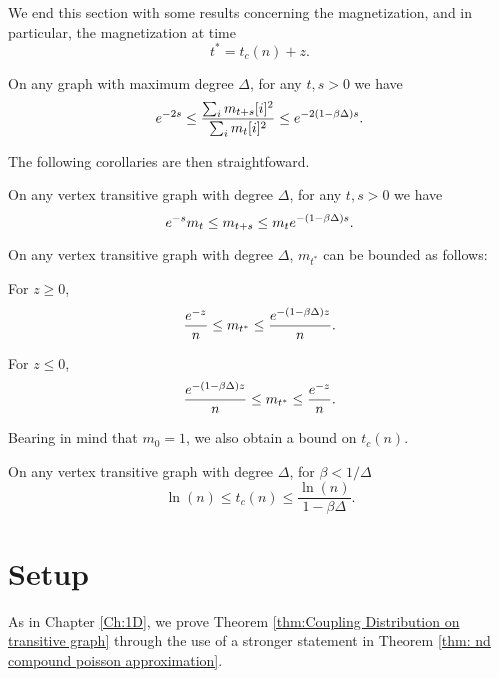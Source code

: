 We end this section with some results concerning the magnetization, and in particular, the magnetization at time
\begin{equation}
	t^* = t_c(n) + z.
\end{equation}

\begin{lemma}
	On any graph with maximum degree $\Delta$, for any $t, s > 0$ we have
	\begin{equation}
		e^{-2s} \leq \frac{\sum_i m_{t+s}[i]^2}{\sum_i m_t[i]^2} \leq e^{-2(1 - \beta \Delta)s}.
	\end{equation}
\end{lemma}
The following corollaries are then straightfoward.
\begin{corollary}
	\label{cor:exponential decay magnetization}
	On any vertex transitive graph with degree $\Delta$, for any $t, s > 0$ we have
	\begin{equation}
		e^{-s} m_t \leq m_{t+s} \leq m_t e^{-(1 - \beta \Delta)s}.
	\end{equation}
\end{corollary}
\begin{corollary}
\label{cor:magnetization of t star}
	On any vertex transitive graph with degree $\Delta$, $m_{t^*}$ can be bounded as follows:

	For $z \geq 0$,
	\begin{equation}
		\frac{e^{-z}}{n} \leq m_{t^*} \leq \frac{e^{-(1 - \beta \Delta)z}}{n}.
	\end{equation}

	For $z \leq 0$,
	\begin{equation}
		\frac{e^{-(1 - \beta \Delta)z}}{n} \leq m_{t^*} \leq \frac{e^{-z}}{n}.
	\end{equation}
\end{corollary}
Bearing in mind that $m_0 = 1$, we also obtain a bound on $t_c(n)$.
\begin{corollary}
	On any vertex transitive graph with degree $\Delta$, for $\beta < 1/\Delta$
	\begin{equation}
		\ln(n) \leq t_c(n) \leq \frac{\ln(n)}{1 - \beta \Delta}.
	\end{equation}
\end{corollary}

\section{Setup}
\label{sec:nd problem setup}
As in Chapter \ref{Ch:1D}, we prove Theorem \ref{thm:Coupling Distribution on transitive graph} through the use of a stronger statement in Theorem \ref{thm: nd compound poisson approximation}.

